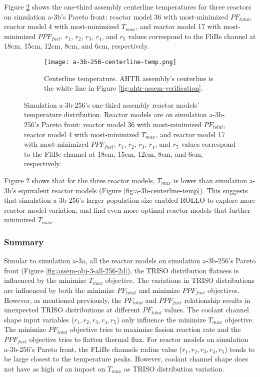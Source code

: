 Figure \ref{fig:a-3b-256-temp-distribution} shows the one-third assembly centerline 
temperatures for three reactors on simulation a-3b's Pareto front: reactor model 36 
with most-minimized $PF_{total}$, reactor model 4 with most-minimized $T_{max}$, and
reactor model 17 with most-minimized $PPF_{fuel}$.
$r_1$, $r_2$, $r_3$, $r_4$, and $r_5$ values correspond to the FliBe channel at 18cm, 
15cm, 12cm, 8cm, and 6cm, respectively.  
\begin{figure}[htbp!]
    \begin{subfigure}{\textwidth}
        \centering
        \texttt{[image: a-3b-256-centerline-temp.png]}
        \caption{Centerline temperature. AHTR assembly's centerline is the white line 
        in Figure \ref{fig:ahtr-assem-verification}.}
        \label{fig:a-3b-256-centerline-temp} 
    \end{subfigure}
    \caption{Simulation a-3b-256's one-third assembly reactor models' temperature 
    distribution. Reactor models are on simulation a-3b-256's Pareto front: 
    reactor model 36 with most-minimized $PF_{total}$, 
    reactor model 4 with most-minimized $T_{max}$, and
    reactor model 17 with most-minimized $PPF_{fuel}$.
    $r_1$, $r_2$, $r_3$, $r_4$, and $r_5$ values correspond to the FliBe channel at 18cm, 
    15cm, 12cm, 8cm, and 6cm, respectively.  }
    \label{fig:a-3b-256-temp-distribution}
\end{figure}
Figure \ref{fig:a-3b-256-temp-distribution} shows that for the three reactor models, 
$T_{max}$ is lower than simulation a-3b's equivalent reactor models 
(Figure \ref{fig:a-3b-centerline-temp}). 
This suggests that simulation a-3b-256's larger population size enabled \gls{ROLLO} 
to explore more reactor model variation, and find even more optimal reactor models 
that further minimized $T_{max}$. 

\subsubsection{Summary}

Simular to simulation a-3a, all the reactor models on simulation a-3b-256's Pareto front 
(Figure \ref{fig:assem-obj-3-all-256-2d}), the TRISO distribution flatness is 
influenced by the minimize $T_{max}$ objective. 
The variations in \gls{TRISO} distributions are influenced by both the minimize 
$PF_{total}$ and minimize $PPF_{fuel}$ objectives. 
However, as mentioned previously, the $PF_{total}$ and $PPF_{fuel}$ relationship
results in unexpected TRISO distributions at different $PF_{total}$ values. 
The coolant channel shape input variables ($r_1, r_2, r_3, r_4, r_5$) only influence 
the minimize $T_{max}$ objective. 
The minimize $PF_{total}$ objective tries to maximize fission reaction rate
and the $PPF_{fuel}$ objective tries to flatten thermal flux. 
For reactor models on simulation a-3b-256's Pareto front, the FLiBe channels radius 
value ($r_1, r_2, r_3, r_4, r_5$) tends to be large closest to the temperature peaks. 
However, coolant channel shape does not have as high of an impact on $T_{max}$ as 
\gls{TRISO} distribution variation. 

